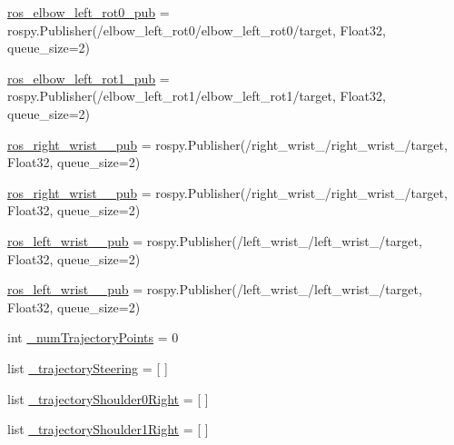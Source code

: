 \begin{DoxyCompactItemize}
\item 
\mbox{\hyperlink{namespacesteering__response__test_a62f69538f10a37002facbba22ba32dfc}{ros\+\_\+elbow\+\_\+left\+\_\+rot0\+\_\+pub}} = rospy.\+Publisher(\textquotesingle{}/elbow\+\_\+left\+\_\+rot0/elbow\+\_\+left\+\_\+rot0/target\textquotesingle{}, Float32, queue\+\_\+size=2)
\item 
\mbox{\hyperlink{namespacesteering__response__test_ab2636912b6d0822f2e2297d8aabd7210}{ros\+\_\+elbow\+\_\+left\+\_\+rot1\+\_\+pub}} = rospy.\+Publisher(\textquotesingle{}/elbow\+\_\+left\+\_\+rot1/elbow\+\_\+left\+\_\+rot1/target\textquotesingle{}, Float32, queue\+\_\+size=2)
\item 
\mbox{\hyperlink{namespacesteering__response__test_a963e86f6663042658714e816c8417bbe}{ros\+\_\+right\+\_\+wrist\+\_\+\_\+pub}} = rospy.\+Publisher(\textquotesingle{}/right\+\_\+wrist\+\_/right\+\_\+wrist\+\_/target\textquotesingle{}, Float32, queue\+\_\+size=2)
\item 
\mbox{\hyperlink{namespacesteering__response__test_aa79661d7d503045aee6c27fe6cc094bf}{ros\+\_\+right\+\_\+wrist\+\_\+\_\+pub}} = rospy.\+Publisher(\textquotesingle{}/right\+\_\+wrist\+\_/right\+\_\+wrist\+\_/target\textquotesingle{}, Float32, queue\+\_\+size=2)
\item 
\mbox{\hyperlink{namespacesteering__response__test_a3993d99a364e4c7ac9a9d87175d154a1}{ros\+\_\+left\+\_\+wrist\+\_\+\_\+pub}} = rospy.\+Publisher(\textquotesingle{}/left\+\_\+wrist\+\_/left\+\_\+wrist\+\_/target\textquotesingle{}, Float32, queue\+\_\+size=2)
\item 
\mbox{\hyperlink{namespacesteering__response__test_a57d0a11d86912a103adf6d4c5df7eece}{ros\+\_\+left\+\_\+wrist\+\_\+\_\+pub}} = rospy.\+Publisher(\textquotesingle{}/left\+\_\+wrist\+\_/left\+\_\+wrist\+\_/target\textquotesingle{}, Float32, queue\+\_\+size=2)
\item 
int \mbox{\hyperlink{namespacesteering__response__test_abce158b2b015f83d13d8f4432a8a7c65}{\+\_\+num\+Trajectory\+Points}} = 0
\item 
list \mbox{\hyperlink{namespacesteering__response__test_a3f2fd736ea7d988e459a0fd1555fe85f}{\+\_\+trajectory\+Steering}} = \mbox{[} \mbox{]}
\item 
list \mbox{\hyperlink{namespacesteering__response__test_aa787f43db8fc5bf6ed98935433da6d0d}{\+\_\+trajectory\+Shoulder0\+Right}} = \mbox{[} \mbox{]}
\item 
list \mbox{\hyperlink{namespacesteering__response__test_a03000f2c69d1e3409e1fa811af9d78db}{\+\_\+trajectory\+Shoulder1\+Right}} = \mbox{[} \mbox{]}

\end{DoxyCompactItemize}
